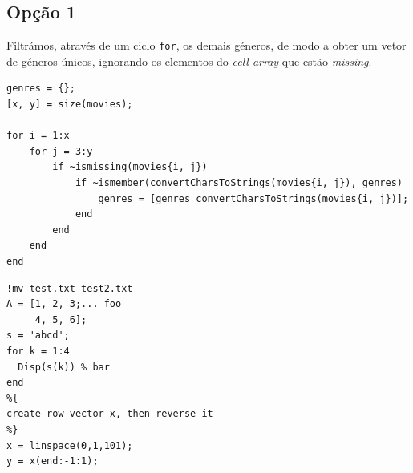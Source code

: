 \documentclass[portuguese, 11pt, a4paper,titlepage, oneside]{article}
\begin{document}
\subsection{Opção 1}
Filtrámos, através de um ciclo \verb|for|, os demais géneros, de modo a obter um vetor de géneros únicos, ignorando os elementos do \textit{cell array} que estão \textit{missing}.

\begin{lstlisting}[style=Matlab-editor]
genres = {};
[x, y] = size(movies);

for i = 1:x
    for j = 3:y
        if ~ismissing(movies{i, j})
            if ~ismember(convertCharsToStrings(movies{i, j}), genres)
                genres = [genres convertCharsToStrings(movies{i, j})];
            end
        end
    end
end
\end{lstlisting}

\begin{lstlisting}[style=Matlab-editor]
%% Sample Matlab code
!mv test.txt test2.txt
A = [1, 2, 3;... foo
     4, 5, 6];
s = 'abcd';
for k = 1:4
  Disp(s(k)) % bar
end
%{
create row vector x, then reverse it
%}
x = linspace(0,1,101);
y = x(end:-1:1);
\end{lstlisting}
\end{document}
